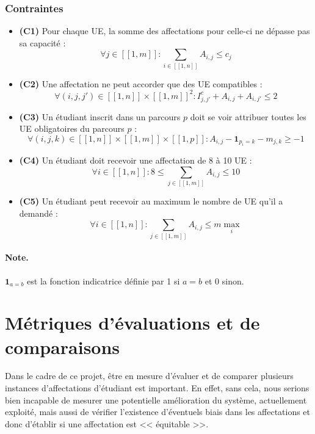 \documentclass{rapport}
\theoremstyle{definition}
\theoremstyle{remark}
\theoremstyle{plain}
\theoremstyle{definition}
\theoremstyle{remark}
\newcommand{\llbracket}{[\![}
\newcommand{\rrbracket}{]\!]}
\begin{document}
\subsubsection{Contraintes}
\begin{itemize}
    \item \textbf{(C1)} \og Pour chaque UE, la somme des affectations pour celle-ci ne dépasse pas sa capacité \fg{} :
    \[
    \forall j \in \llbracket 1,m \rrbracket : \sum_{i \in \llbracket 1,n \rrbracket} A_{i,j} \le c_j
    \]

    \item \textbf{(C2)} \og Une affectation ne peut accorder que des UE compatibles \fg{} :
    \[
    \forall (i,j,j') \in \llbracket 1,n \rrbracket \times \llbracket 1,m \rrbracket^2 : I^c_{j,j'} + A_{i,j} + A_{i,j'} \le 2
    \]

    \item \textbf{(C3)} \og Un étudiant inscrit dans un parcours $p$ doit se voir attribuer toutes les UE obligatoires du parcours $p$ \fg{} :
    \[
    \forall (i,j,k) \in \llbracket 1,n \rrbracket \times \llbracket 1,m \rrbracket \times \llbracket 1,p \rrbracket : A_{i,j} - \mathbf{1}_{p_i=k} - m_{j,k} \ge -1
    \]

    \item \textbf{(C4)} \og Un étudiant doit recevoir une affectation de 8 à 10 UE \fg{} :
    \[
    \forall i \in \llbracket 1,n \rrbracket : 8 \le \sum_{j \in \llbracket 1,m \rrbracket} A_{i,j} \le 10
    \]

    \item \textbf{(C5)} \og Un étudiant peut recevoir au maximum le nombre de UE qu'il a demandé \fg{} :
    \[
    \forall i \in \llbracket 1,n \rrbracket : \sum_{j \in \llbracket 1,m \rrbracket} A_{i,j} \le m\!\max_i
    \]
\end{itemize}

\paragraph{Note.}
$\mathbf{1}_{a=b}$ est la fonction indicatrice définie par 1 si $a=b$ et 0 sinon.


\section{Métriques d'évaluations et de comparaisons}

Dans le cadre de ce projet, être en mesure d'évaluer et de comparer plusieurs instances d'affectations d'étudiant est important. 
En effet, sans cela, nous serions bien incapable de mesurer une potentielle amélioration du système, actuellement exploité, mais aussi de vérifier l'existence d'éventuels biais
dans les affectations et donc d'établir si une affectation est << équitable >>.
\end{document}
